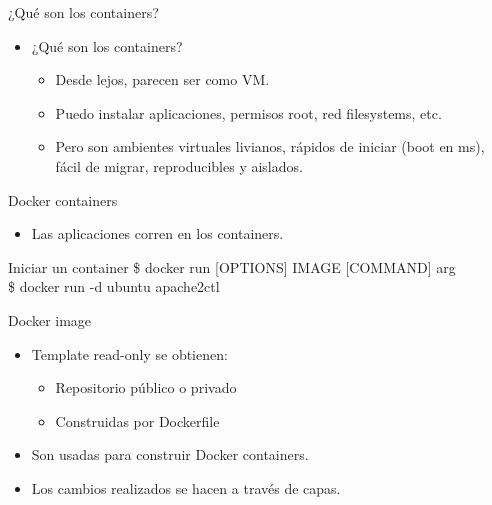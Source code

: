 \documentclass[compress]{beamer}
\begin{document}
\begin{frame}{¿Qué son los containers?}
	\begin{itemize}
		\item ¿Qué son los containers?
			\begin{itemize}
				\item Desde lejos, parecen ser como VM.
				\item Puedo instalar aplicaciones, permisos root, red filesystems, etc.
				\item Pero son ambientes virtuales livianos, rápidos de iniciar (boot en ms), fácil de migrar, reproducibles y aislados.
			\end{itemize}
	\end{itemize}
\end{frame}


\begin{frame}{}
	\begin{figure}
		\centering
	\end{figure}
\end{frame}

\begin{frame}{Docker containers}

\begin{itemize}
	\item Las aplicaciones corren en los containers.
\end{itemize}
	
	
	\begin{exampleblock}{Iniciar un container}
		\$ docker run [OPTIONS] IMAGE [COMMAND] arg\\
		\$ docker run -d ubuntu apache2ctl
	\end{exampleblock}
\end{frame}


\begin{frame}{Docker image}
\begin{itemize}
	\item Template read-only se obtienen:
	\begin{itemize}
		\item Repositorio público o privado
		\item Construidas por Dockerfile
	\end{itemize}
	\item Son usadas para construir Docker containers.
	\item Los cambios realizados se hacen a través de capas.
\end{itemize}
\begin{figure}[H]
  \centering
\end{figure}	
\end{frame}
\end{document}
